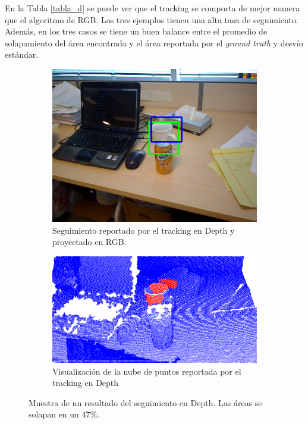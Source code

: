 En la Tabla \ref{tabla_d} se puede ver que el tracking se comporta de mejor manera que el algoritmo de RGB. Los tres ejemplos tienen una alta tasa de seguimiento. Además, en los tres casos se tiene un buen balance entre el promedio de solapamiento del área encontrada y el área reportada por el \textit{ground truth} y desvío estándar.

\begin{figure}
	\centering
	\begin{subfigure}[b]{\textwidth}
		\includegraphics[width=\textwidth]{img/frame_98_taza_rgb.png}
		\caption{Seguimiento reportado por el tracking en Depth y proyectado en RGB.}
		\label{taza_ocluida_rgb}
	\end{subfigure}
	\quad
	\begin{subfigure}[b]{\textwidth}
		\includegraphics[width=\textwidth]{img/frame_98_taza_pcd.png}
		\caption{Visualización de la nube de puntos reportada por el tracking en Depth}
		\label{taza_ocluida_pcd}
	\end{subfigure}
	\caption{Muestra de un resultado del seguimiento en Depth. Las áreas se solapan en un 47\%.}
	\label{taza_ocluida}
\end{figure}

